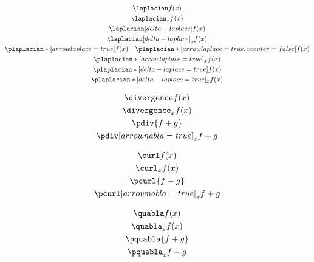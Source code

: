 \documentclass[parskip=half]{scrartcl}
\begin{document}
\fulllinerule

\begin{SideBySideExample}[xrightmargin=.3\textwidth,gobble=2]
  \begin{gather*}
    \laplacian f(x)\\
    \laplacian_{x} f(x)\\
    \laplacian[delta-laplace] f(x)\\
    \laplacian[delta-laplace]_{x} f(x)\\
    \plaplacian*[arrowlaplace=true]{f(x)}
    \quad \plaplacian*[arrowlaplace=true,vcenter=false]{f(x)} \\
    \plaplacian*[arrowlaplace=true]_{x}{f(x)}\\
    \plaplacian*[delta-laplace=true]{f(x)}\\
    \plaplacian*[delta-laplace=true]_{x}{f(x)}\\
  \end{gather*}
\end{SideBySideExample}

\fulllinerule

\begin{SideBySideExample}[xrightmargin=.3\textwidth,gobble=2]
  \begin{gather*}
    \divergence f(x) \\
    \divergence_{x} f(x) \\
    \pdiv{f+g}\\
    \pdiv[arrownabla=true]_{x}{f+g}\\
  \end{gather*}
\end{SideBySideExample}

\fulllinerule

\begin{SideBySideExample}[xrightmargin=.3\textwidth,gobble=2]
  \begin{gather*}
    \curl f(x)\\
    \curl_{x} f(x)\\
    \pcurl{f+g}\\
    \pcurl[arrownabla=true]_{x}{f+g}
  \end{gather*}
\end{SideBySideExample}

\fulllinerule

\begin{SideBySideExample}[xrightmargin=.3\textwidth,gobble=2]
  \begin{gather*}
    \quabla f(x)\\
    \quabla_{x} f(x)\\
    \pquabla{f+g}\\
    \pquabla_{x}{f+g}
  \end{gather*}
\end{SideBySideExample}
\end{document}
